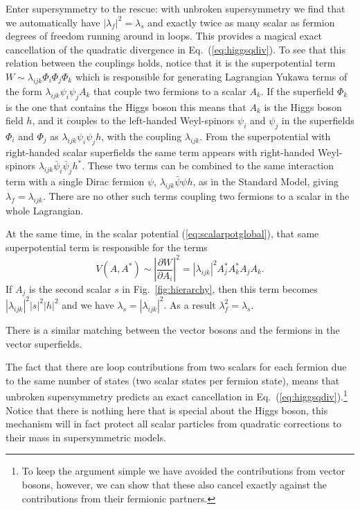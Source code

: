 \documentclass[notes.tex]{subfiles}
\begin{document}
Enter supersymmetry to the rescue: with unbroken supersymmetry we find that we automatically have $|\lambda_f|^2 = \lambda_s$ and exactly twice as many scalar as fermion degrees of freedom running around in loops. This provides a magical exact cancellation of the quadratic divergence in Eq.~(\ref{eq:higgsqdiv}). To see that this relation between the couplings holds, notice that it is the superpotential term $W \sim \lambda_{ijk}\Phi_i\Phi_j \Phi_k$ which is responsible for generating Lagrangian Yukawa terms of the form $\lambda_{ijk} \psi_i\psi_j A_k$ that couple two fermions to a scalar $A_k$. If the superfield $\Phi_k$ is the one that contains the Higgs boson this means that $A_k$ is the Higgs boson field $h$, and it couples to the left-handed Weyl-spinors $\psi_i$ and $\psi_j$  in the superfields $\Phi_i$ and $\Phi_j$  as $\lambda_{ijk}\psi_i\psi_j h$, with the coupling $\lambda_{ijk}$. From the superpotential with right-handed scalar superfields the same term appears with right-handed Weyl-spinors $\lambda_{ijk}\bar\psi_i\bar\psi_j h^*$. These two terms can be combined to the same interaction term with a single Dirac fermion $\psi$,  $\lambda_{ijk}\bar\psi\psi h$, as in the Standard Model, giving $\lambda_f = \lambda_{ijk}$. There are no other such terms coupling two fermions to a scalar in the whole Lagrangian.

At the same time, in the scalar potential (\ref{eq:scalarpotglobal}), that same superpotential term is responsible for the terms
\begin{equation}
V(A,A^*) \sim \left|\frac{\partial W}{\partial A_i}\right|^2 = |\lambda_{ijk}|^2A^*_jA^*_kA_jA_k.
\end{equation}
If $A_j$ is the second scalar $s$ in Fig.~\ref{fig:hierarchy}, then this term becomes $|\lambda_{ijk}|^2|s|^2|h|^2$ and we have $\lambda_s=|\lambda_{ijk}|^2$. As a result $\lambda_f^2=\lambda_s$.

There is a similar matching between the vector bosons and the fermions in the vector superfields.

The fact that there are loop contributions from two scalars for each fermion due to the same number of states (two scalar states per fermion state), means that unbroken supersymmetry predicts an exact cancellation in Eq.~(\ref{eq:higgsqdiv}).\footnote{To keep the argument simple we have avoided the contributions from vector bosons, however, we can show that these also cancel exactly against the contributions from their fermionic partners.} Notice that there is nothing here that is special about the Higgs boson, this mechanism will in fact protect all scalar particles from quadratic corrections to their mass in supersymmetric models.
\end{document}
